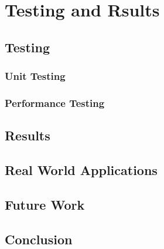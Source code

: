 \chapter{Testing and Rsults}

\section{Testing}
\subsection{Unit Testing}
\subsection{Performance Testing}

\section{Results}
\section{Real World Applications}
\section{Future Work}
\section{Conclusion}